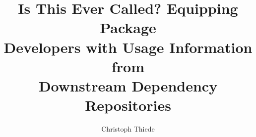 \title[Downstream Dependency Mining]{Is This Ever Called? Equipping Package \\ Developers with Usage Information from \\ Downstream Dependency Repositories}

\author{Christoph Thiede}

\renewcommand{\shortauthors}{Christoph Thiede}
